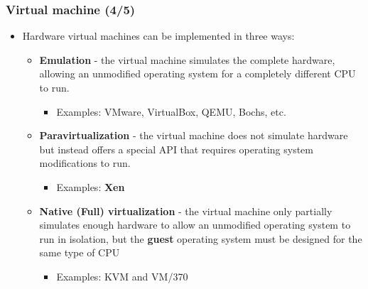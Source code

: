\documentclass[CJKutf8,xcolor=pdftex,dvipsnames,table]{beamer}
\begin{document}
\begin{CJK*}{UTF8}{song}
  \begin{frame}
    \frametitle{Virtual machine (4/5)} \pause
    \begin{itemize}
    \item{Hardware virtual machines can be implemented in three ways:} \pause
      \begin{itemize}
      \item{\textbf{Emulation} \pause - the virtual machine simulates the complete hardware, allowing an unmodified operating system for a completely different CPU to run.} \pause
        \begin{itemize}
        \item{Examples: VMware, VirtualBox, QEMU, Bochs, etc.} \pause
        \end{itemize}
      \item{\textbf{Paravirtualization} \pause - the virtual machine does not simulate hardware but instead offers a special API that requires operating system modifications to run.} \pause
        \begin{itemize}
        \item{Examples: \textbf{Xen}} \pause
        \end{itemize}
      \item{\textbf{Native (Full) virtualization} \pause - the virtual machine only partially simulates enough hardware to allow an unmodified operating system to run in isolation, but the \textbf{guest} operating system must be designed for the same type of CPU} \pause
        \begin{itemize}
        \item{Examples: KVM and VM/370}
        \end{itemize}
      \end{itemize}
    \end{itemize}
  \end{frame}


\end{CJK*}
\end{document}
